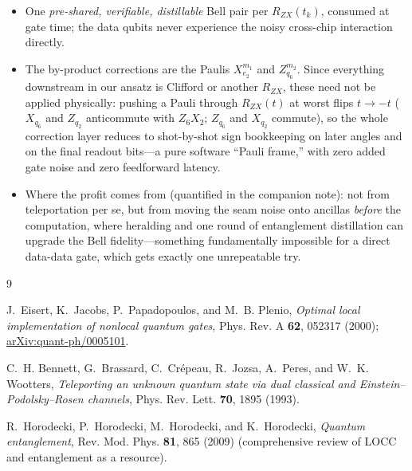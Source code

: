 \documentclass[11pt]{article}
\newcommand{\RZX}{R_{ZX}}
\begin{document}
\begin{itemize}[leftmargin=2em]
  \item One \emph{pre-shared, verifiable, distillable} Bell pair per
        $\RZX(t_k)$, consumed at gate time; the data qubits never experience
        the noisy cross-chip interaction directly.
  \item The by-product corrections are the Paulis $X^{m_1}_{e_2}$ and
        $Z^{m_2}_{q_6}$. Since everything downstream in our ansatz is
        Clifford or another $\RZX$, these need not be applied physically:
        pushing a Pauli through $\RZX(t)$ at worst flips $t \to -t$
        ($X_{q_6}$ and $Z_{q_2}$ anticommute with $Z_6 X_2$; $Z_{q_6}$ and
        $X_{q_2}$ commute), so the whole correction layer reduces to
        shot-by-shot sign bookkeeping on later angles and on the final
        readout bits---a pure software ``Pauli frame,'' with zero added gate
        noise and zero feedforward latency.
  \item Where the profit comes from (quantified in the companion note): not
        from teleportation per se, but from moving the seam noise onto
        ancillas \emph{before} the computation, where heralding and one round
        of entanglement distillation can upgrade the Bell fidelity---something
        fundamentally impossible for a direct data-data gate, which gets
        exactly one unrepeatable try.
\end{itemize}

\begin{thebibliography}{9}

J.~Eisert, K.~Jacobs, P.~Papadopoulos, and M.~B. Plenio,
\emph{Optimal local implementation of nonlocal quantum gates},
Phys. Rev. A \textbf{62}, 052317 (2000);
\href{https://arxiv.org/abs/quant-ph/0005101}{arXiv:quant-ph/0005101}.

C.~H. Bennett, G.~Brassard, C.~Cr\'epeau, R.~Jozsa, A.~Peres, and
W.~K. Wootters,
\emph{Teleporting an unknown quantum state via dual classical and
Einstein--Podolsky--Rosen channels},
Phys. Rev. Lett. \textbf{70}, 1895 (1993).

R.~Horodecki, P.~Horodecki, M.~Horodecki, and K.~Horodecki,
\emph{Quantum entanglement},
Rev. Mod. Phys. \textbf{81}, 865 (2009)
(comprehensive review of LOCC and entanglement as a resource).

\end{thebibliography}
\end{document}
